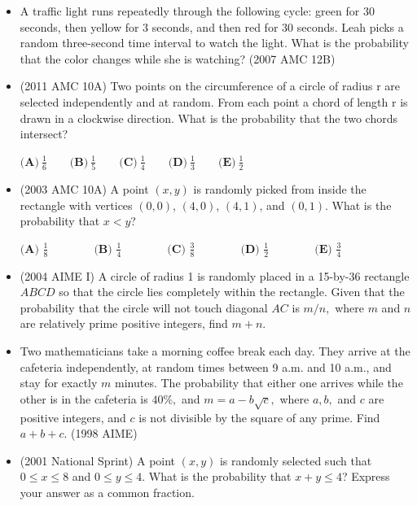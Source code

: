 \documentclass{article}
\begin{document}
\begin{itemize}
\item A traffic light runs repeatedly through the following cycle: green for $30$ seconds, then yellow for $3$ seconds, and then red for $30$ seconds. Leah picks a random three-second time interval to watch the light. What is the probability that the color changes while she is watching? (2007 AMC 12B)


\item (2011 AMC 10A) Two points on the circumference of a circle of radius r are selected independently and at random. From each point a chord of length r is drawn in a clockwise direction. What is the probability that the two chords intersect?

$ \textbf{(A)}\ \frac{1}{6}\qquad\textbf{(B)}\ \frac{1}{5}\qquad\textbf{(C)}\ \frac{1}{4}\qquad\textbf{(D)}\ \frac{1}{3}\qquad\textbf{(E)}\ \frac{1}{2} $

\item (2003 AMC 10A) A point $(x,y)$ is randomly picked from inside the rectangle with  vertices $(0,0)$, $(4,0)$, $(4,1)$, and $(0,1)$. What is the probability that $x<y$? 

\begin{center}
$ \textbf{(A) \ } \frac{1}{8}\qquad\qquad \textbf{(B) \ } \frac{1}{4}\qquad\qquad \textbf{(C) \ } \frac{3}{8}\qquad\qquad \textbf{(D) \ } \frac{1}{2}\qquad\qquad \textbf{(E) \ } \frac{3}{4} $
\end{center}

\item (2004 AIME I) A circle of radius 1 is randomly placed in a 15-by-36 rectangle $ ABCD $ so that the circle lies completely within the rectangle. Given that the probability that the circle will not touch diagonal $ AC $ is $ m/n, $ where $ m $ and $ n $ are relatively prime positive integers, find $ m + n. $ 

\item Two mathematicians take a morning coffee break each day.  They arrive at the cafeteria independently, at random times between 9 a.m. and 10 a.m., and stay for exactly $m$ minutes.  The probability that either one arrives while the other is in the cafeteria is $40 \%,$ and $m = a - b\sqrt {c},$ where $a, b,$ and $c$ are positive integers, and $c$ is not divisible by the square of any prime.  Find $a + b + c.$ (1998 AIME) 

\item (2001 National Sprint) A point $(x,y)$ is randomly selected such that $0\le x\le 8$ and $0\le y\le 4$. What is the probability that $x+y\le 4$? Express your answer as a common fraction.


\end{itemize}
\end{document}
